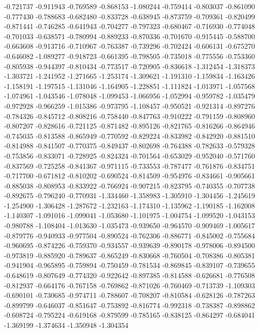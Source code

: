 -0.721737
-0.911943
-0.769589
-0.868153
-1.080244
-0.759414
-0.803037
-0.861090
-0.777430
-0.788683
-0.682480
-0.833728
-0.638945
-0.873759
-0.709361
-0.820499
-0.871441
-0.746285
-0.641943
-0.704277
-0.797323
-0.680467
-0.716930
-0.774048
-0.701033
-0.638571
-0.780994
-0.889233
-0.870336
-0.701670
-0.915445
-0.588700
-0.663608
-0.913716
-0.710967
-0.763387
-0.739296
-0.702424
-0.606131
-0.675270
-0.646082
-1.089277
-0.918723
-0.661395
-0.798505
-0.735018
-0.775556
-0.753360
-0.805938
-0.944397
-0.810434
-0.773517
-0.720905
-0.836618
-1.312454
-1.318373
-1.303721
-1.241952
-1.271665
-1.253174
-1.309621
-1.191310
-1.159834
-1.163426
-1.158191
-1.197515
-1.131046
-1.164905
-1.228851
-1.111824
-1.013971
-1.057568
-1.074961
-1.043546
-1.078048
-1.099453
-1.066956
-1.052994
-0.959782
-1.035479
-0.972928
-0.966259
-1.015386
-0.973795
-1.108457
-0.950521
-0.921314
-0.897276
-0.784326
-0.845712
-0.808216
-0.758440
-0.847763
-0.910222
-0.791159
-0.808960
-0.807207
-0.828616
-0.721125
-0.871482
-0.895126
-0.821765
-0.816266
-0.864946
-0.745035
-0.813588
-0.865949
-0.770592
-0.829224
-0.833982
-0.842920
-0.881510
-0.814988
-0.841507
-0.770375
-0.849437
-0.802698
-0.764388
-0.782633
-0.579328
-0.753856
-0.833071
-0.728925
-0.824324
-0.701564
-0.653029
-0.952040
-0.571760
-0.837569
-0.725258
-0.841367
-0.971115
-0.733553
-0.787477
-0.761876
-0.834751
-0.717700
-0.671812
-0.810202
-0.690524
-0.814509
-0.954976
-0.834661
-0.905661
-0.885038
-0.808953
-0.833922
-0.766924
-0.907215
-0.823795
-0.740355
-0.707738
-0.892675
-0.796240
-0.770931
-1.334460
-1.358983
-1.305910
-1.304456
-1.245619
-1.254900
-1.306428
-1.287672
-1.232163
-1.174310
-1.135962
-1.190185
-1.162008
-1.140307
-1.091016
-1.099041
-1.053680
-1.101975
-1.004754
-1.099520
-1.043153
-0.980788
-1.108404
-1.013630
-1.035473
-0.939650
-0.964570
-0.909469
-1.005617
-0.879776
-0.940933
-0.977504
-0.890524
-0.762306
-0.886771
-0.845002
-0.755684
-0.960695
-0.874226
-0.759370
-0.934557
-0.939639
-0.890178
-0.978006
-0.894500
-0.973819
-0.885920
-0.789637
-0.865249
-0.830668
-0.760504
-0.708386
-0.805381
-0.941904
-0.965895
-0.759894
-0.750459
-0.781534
-0.869845
-0.839107
-0.739655
-0.648619
-0.807649
-0.774320
-0.922642
-0.897385
-0.814588
-0.626681
-0.776508
-0.812937
-0.664176
-0.767158
-0.769862
-0.871026
-0.760469
-0.713739
-1.109303
-0.690101
-0.730685
-0.974711
-0.788607
-0.708207
-0.810584
-0.628126
-0.787263
-0.899799
-0.646037
-0.851647
-0.753892
-0.816774
-0.992318
-0.738387
-0.898862
-0.608724
-0.795224
-0.619168
-0.879599
-0.785165
-0.838125
-0.864297
-0.684041
-1.369199
-1.374634
-1.350948
-1.304354
